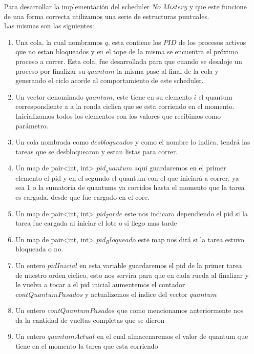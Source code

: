 Para desarrollar la implementación del scheduler $No$ $Mistery$ y que este funcione de una forma correcta
utilizamos una serie de estructuras puntuales. \\
Las mismas son las siguientes:\\
\begin{enumerate}
 \item Una cola, la cual nombramos $q$, esta contiene los $PID$ de los procesos activos que no estan
 bloqueados y en el tope de la misma se encuentra el próximo proceso a correr. Esta cola,
 fue desarrollada para que cuando se desaloje un proceso por finalizar su $quantum$ la misma pase al final de
 la cola y generando el ciclo acorde al comportamiento de este scheduler.
 \item Un vector denominado $quantum$, este tiene en su elemento $i$ el quantum correspondiente a
a la ronda ciclica que se esta corriendo en el momento. Inicializamos todos los elementos con los valores que recibimos
como par\'ametro.
\item Un cola nombrada como $desbloqueados$ y como el nombre lo indica, tendr\'a las tareas que se desbloquearon y estan
listas para correr.
\item Un map de pair<int, int> $pid_quantum$ aqui guardaremos en el primer elemento el pid y en el segundo el quantum con el que 
iniciar\'a a correr, ya sea 1 o la sumatoria de quantums ya corridos hasta el momento que la tarea es cargada.
desde que fue cargado en el core.
\item Un map de pair<int, int> $pid_Tarde$ este nos indicara dependiendo el pid si la tarea fue cargada al iniciar el lote o si llego mas 
tarde
\item Un map de pair<int, int> $pid_Bloqueado$ este map nos dir\'a si la tarea estuvo bloqueada o no.
\item Un entero $pidInicial$ en esta variable guardaremos el pid de la primer tarea de nuestro orden ciclico, esto
nos servira para que en cada rueda al finalizar y le vuelva a tocar a el pid inicial aumentemos el contador $contQuantumPasados$
y actualizemos el indice del vector $quantum$
\item Un entero $contQuantumPasados$ que como mencionamos anteriormente nos da la cantidad de vueltas completas que se dieron
\item Un entero $quantumActual$ en el cual almacenaremos el valor de quantum que tiene en el momento la tarea que esta corriendo
\end{enumerate}

